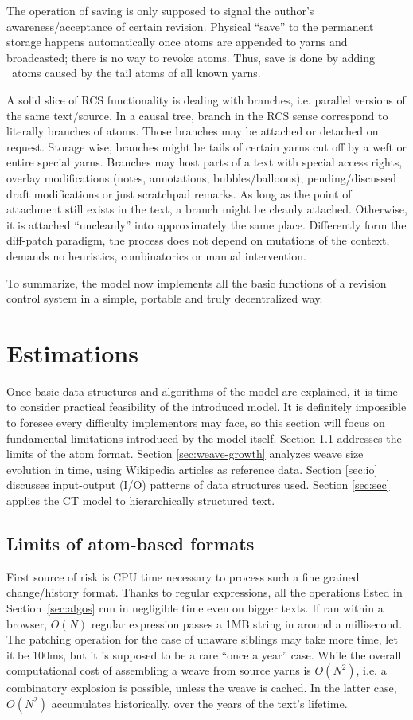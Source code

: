 \documentclass{acm_proc_article-sp}
\begin{document}
The operation of saving is only supposed to signal the author's awareness/acceptance of certain revision.
Physical ``save'' to the permanent storage happens automatically once atoms are appended to yarns and broadcasted; there is no way to revoke atoms.
Thus, save is done by  adding \zero ~atoms caused by the tail atoms of all known yarns.

A solid slice of RCS functionality is dealing with branches, i.e. parallel versions of the same text/source.
In a causal tree, branch in the RCS sense correspond to literally branches of atoms.
Those branches may be attached or detached on request. Storage wise, branches might be tails of certain yarns cut off by a weft or entire special yarns.
Branches may host parts of a text with special access rights, overlay modifications (notes, annotations, bubbles/balloons), pending/discussed draft modifications or just scratchpad remarks.
As long as the point of attachment still exists in the text, a branch might be cleanly attached.
Otherwise, it is attached ``uncleanly'' into approximately the same place.
Differently form the diff-patch paradigm, the process does not depend on mutations of the context, demands no heuristics, combinatorics or manual intervention.

To summarize, the model now implements all the basic functions of a revision control system in a simple, portable and truly decentralized way.

\section{Estimations} \label{sec:estim}

Once basic data structures and algorithms of the model are explained,
it is time to consider practical feasibility of the introduced model.
It is definitely impossible to foresee every difficulty implementors may face, so this section will focus on fundamental limitations introduced by the model itself.
Section \ref{sec:formats} addresses the limits of the atom format.
Section \ref{sec:weave-growth} analyzes weave size evolution in time, using Wikipedia articles as reference data.
Section \ref{sec:io} discusses input-output (I/O) patterns of data structures used.
Section \ref{sec:sec} applies the CT model to hierarchically structured text.

\subsection{Limits of atom-based formats} \label{sec:formats}
First source of risk is CPU time necessary to process such a fine grained change/history format.
Thanks to regular expressions, all the operations listed in Section~\ref{sec:algos} run in negligible time even on bigger texts. 
If ran within a browser, $O(N)$ regular expression passes a 1MB string in around a millisecond.
The patching operation for the case of unaware siblings may take more time, let it be 100ms, but it is supposed to be a rare ``once a year'' case.
While the overall computational cost of assembling a weave from source yarns is $O(N^{2})$, i.e. a combinatory explosion is possible, unless the weave is cached.
In the latter case, $O(N^{2})$ accumulates historically, over the years of the text's lifetime.
\end{document}
